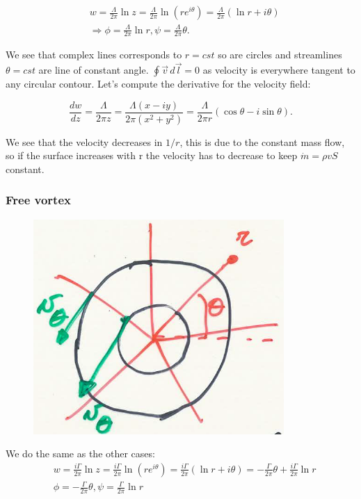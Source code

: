  		\begin{equation}
 		\begin{aligned}
 		&w = \frac{\Lambda}{2\pi} \ln z = \frac{\Lambda}{2\pi} \ln (r e^{i\theta}) = \frac{\Lambda}{2\pi} (\ln r + i\theta) \\
 		&\Rightarrow \phi = \frac{\Lambda}{2\pi} \ln r, \psi =  \frac{\Lambda}{2\pi}\theta.
 		\end{aligned}
 		\end{equation}
 		
 		We see that complex lines corresponds to $r =cst$ so are circles and streamlines $\theta = cst$ are line of constant angle. $\oint \vec{v}\, d\vec{l}=0$ as velocity is everywhere tangent to any circular contour. Let's compute the derivative for the velocity field:
 		
 		\begin{equation}
 		\frac{dw}{dz} = \frac{\Lambda}{2\pi z} = \frac{\Lambda (x-iy)}{2\pi (x^2+y^2)} = \frac{\Lambda}{2\pi r} (\cos \theta - i \sin \theta).
 		\end{equation}
 		
 		We see that the velocity decreases in $1/r$, this is due to the constant mass flow, so if the surface increases with r the velocity has to decrease to keep $\dot{m} = \rho v S$ constant. 
 		
 	\subsubsection{Free vortex}
 		\begin{figure}
		\vspace{-5mm}
		\includegraphics[scale=0.33]{ch2/26}
		\end{figure}
		We do the same as the other cases: 
 		\begin{equation}
 		\begin{aligned}
 		&w = \frac{i\Gamma}{2\pi} \ln z = \frac{i\Gamma}{2\pi} \ln (re^{i\theta}) = \frac{i\Gamma}{2\pi} (\ln r + i\theta) = -\frac{\Gamma}{2\pi} \theta + \frac{i\Gamma}{2\pi} \ln r \\
 		&\phi = -\frac{\Gamma}{2\pi} \theta, \psi = \frac{\Gamma}{2\pi} \ln r
 		\end{aligned}
 		\end{equation}
 		
